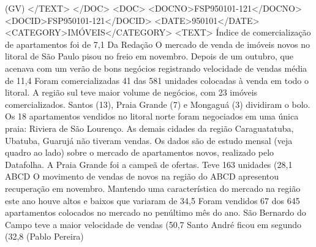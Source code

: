 (GV)
</TEXT>
</DOC>
<DOC>
<DOCNO>FSP950101-121</DOCNO>
<DOCID>FSP950101-121</DOCID>
<DATE>950101</DATE>
<CATEGORY>IMÓVEIS</CATEGORY>
<TEXT>
Índice de comercialização de apartamentos foi de 7,1%
Da Redação 
O mercado de venda de imóveis novos no litoral de São Paulo pisou no freio em novembro. Depois de um outubro, que acenava com um verão de bons negócios registrando velocidade de vendas média de 11,4%
Foram comercializadas 41 das 581 unidades colocadas à venda em todo o litoral. A região sul teve maior volume de negócios, com 23 imóveis comercializados. Santos (13), Praia Grande (7) e Mongaguá (3) dividiram o bolo.
Os 18 apartamentos vendidos no litoral norte foram negociados em uma única praia: Riviera de São Lourenço. As demais cidades da região Caraguatatuba, Ubatuba, Guarujá não tiveram vendas.
Os dados são de estudo mensal (veja quadro ao lado) sobre o mercado de apartamentos novos, realizado pelo Datafolha.
A Praia Grande foi a campeã de ofertas. Teve 163 unidades (28,1%
ABCD 
O movimento de vendas de novos na região do ABCD apresentou recuperação em novembro.
Mantendo uma característica do mercado na região este ano houve altos e baixos que variaram de 34,5%
Foram vendidos 67 dos 645 apartamentos colocados no mercado no penúltimo mês do ano. São Bernardo do Campo teve a maior velocidade de vendas (50,7%
Santo André ficou em segundo (32,8%
(Pablo Pereira)

